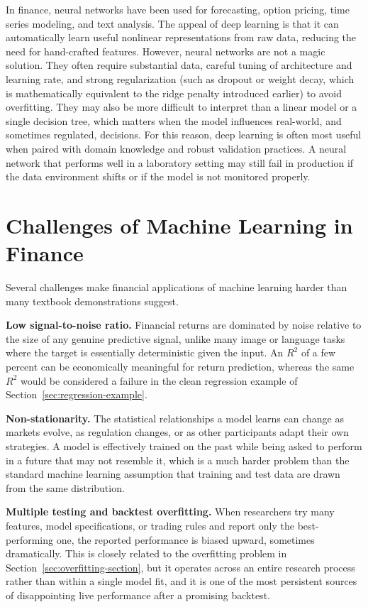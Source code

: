 \documentclass[../ai_in_finance]{subfiles}
\begin{document}
In finance, neural networks have been used for forecasting, option pricing, time series modeling, and text analysis. The appeal of deep learning is that it can automatically learn useful nonlinear representations from raw data, reducing the need for hand-crafted features. However, neural networks are not a magic solution. They often require substantial data, careful tuning of architecture and learning rate, and strong regularization (such as dropout or weight decay, which is mathematically equivalent to the ridge penalty introduced earlier) to avoid overfitting. They may also be more difficult to interpret than a linear model or a single decision tree, which matters when the model influences real-world, and sometimes regulated, decisions. For this reason, deep learning is often most useful when paired with domain knowledge and robust validation practices. A neural network that performs well in a laboratory setting may still fail in production if the data environment shifts or if the model is not monitored properly.

\section{Challenges of Machine Learning in Finance}

Several challenges make financial applications of machine learning harder than many textbook demonstrations suggest.

\textbf{Low signal-to-noise ratio.} Financial returns are dominated by noise relative to the size of any genuine predictive signal, unlike many image or language tasks where the target is essentially deterministic given the input. An $R^2$ of a few percent can be economically meaningful for return prediction, whereas the same $R^2$ would be considered a failure in the clean regression example of Section~\ref{sec:regression-example}.

\textbf{Non-stationarity.} The statistical relationships a model learns can change as markets evolve, as regulation changes, or as other participants adapt their own strategies. A model is effectively trained on the past while being asked to perform in a future that may not resemble it, which is a much harder problem than the standard machine learning assumption that training and test data are drawn from the same distribution.

\textbf{Multiple testing and backtest overfitting.} When researchers try many features, model specifications, or trading rules and report only the best-performing one, the reported performance is biased upward, sometimes dramatically. This is closely related to the overfitting problem in Section~\ref{sec:overfitting-section}, but it operates across an entire research process rather than within a single model fit, and it is one of the most persistent sources of disappointing live performance after a promising backtest.
\end{document}
